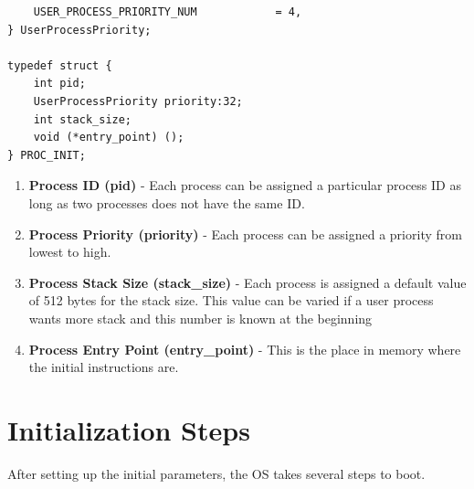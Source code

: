 \documentclass[12pt,twocolumn]{report}
\begin{document}
\begin{enumerate}
\begin{lstlisting}
    USER_PROCESS_PRIORITY_NUM            = 4,
} UserProcessPriority;

typedef struct {
    int pid;
    UserProcessPriority priority:32;
    int stack_size;
    void (*entry_point) ();
} PROC_INIT;
\end{lstlisting}
        \begin{enumerate}
            \item { \bf Process ID (pid) }- Each process can be assigned a particular process ID as long as two processes does not have the same ID.
            \item { \bf Process Priority (priority) }- Each process can be assigned a priority from lowest to high.
            \item { \bf Process Stack Size (stack\_size) }- Each process is assigned a default value of 512 bytes for the stack size. This value can be varied if a user process wants more stack and this number is known at the beginning
            \item { \bf Process Entry Point (entry\_point) }- This is the place in memory where the initial instructions are.
        \end{enumerate}
\end{enumerate}

\section{Initialization Steps}
After setting up the initial parameters, the OS takes several steps to boot.
\end{document}
